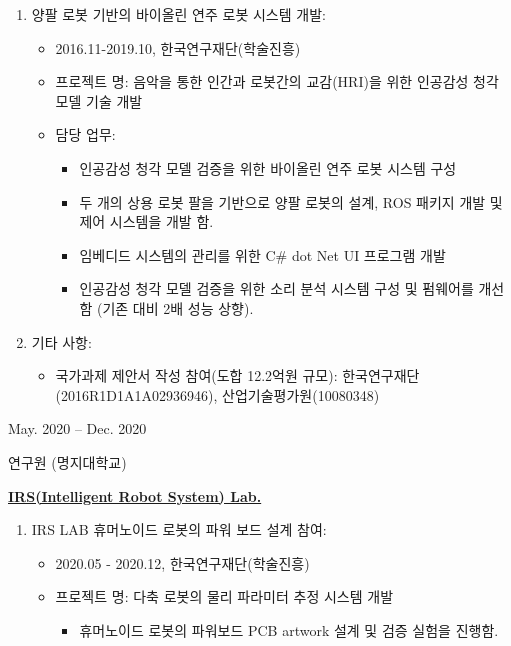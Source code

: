 \documentclass[a4paper,10pt]{article}
\newlength{\cvcolumngapwidth}
\newlength{\cvleftcolumnwidth}
\newlength{\cvrightcolumnwidth}
\newcommand{\cvtitlestyle}[1]{{\large\cvtitlefont\textcolor{cvtitlecolor}{#1}}}
\newcommand{\cvdurationstyle}[1]{{\small\cvdurationfont\textcolor{cvdurationcolor}{#1}}}
\newlength{\cvafteritemskipamount}
\newlength{\cvaftertitleskipamount}
\newlength{\cvparskip}
\newcommand{\cvitem}[2]{
    \begin{minipage}[t]{\cvleftcolumnwidth}
        \raggedleft #1
    \end{minipage}%
    \hspace{\cvcolumngapwidth}%
    \begin{minipage}[t]{\cvrightcolumnwidth}
        \setlength{\parskip}{\cvparskip} #2
    \end{minipage}

    \vspace{\cvafteritemskipamount}
}
\newcommand{\cvtitle}[1]{
    \cvtitlestyle{#1}

    \vspace{\cvaftertitleskipamount}
    \vspace{-\cvparskip}
}
\begin{document}
{\begin{enumerate}
        \item 양팔 로봇 기반의 바이올린 연주 로봇 시스템 개발:
        \begin{itemize}
            \item 2016.11-2019.10, 한국연구재단(학술진흥)
            \item 프로젝트 명: 음악을 통한 인간과 로봇간의 교감(HRI)을 위한 인공감성 청각 모델 기술 개발
            \item 담당 업무:
                \begin{itemize}
                    \item 인공감성 청각 모델 검증을 위한 바이올린 연주 로봇 시스템 구성
                    \item 두 개의 상용 로봇 팔을 기반으로 양팔 로봇의 설계, ROS 패키지 개발 및 제어 시스템을 개발 함.
                    \item 임베디드 시스템의 관리를 위한 C# dot Net UI 프로그램 개발
                    \item 인공감성 청각 모델 검증을 위한 소리 분석 시스템 구성 및 펌웨어를 개선함 (기존 대비 2배 성능 상향).
                \end{itemize}
        \end{itemize}
        \item 기타 사항:
        \begin{itemize}
            \item 국가과제 제안서 작성 참여(도합 12.2억원 규모): 
            \newline 한국연구재단(2016R1D1A1A02936946), 산업기술평가원(10080348)
        \end{itemize}
    \end{enumerate}
}

\cvitem{
    \cvdurationstyle{May. 2020 -- Dec. 2020}
}{
    \cvtitle{연구원 (명지대학교)} 
    \item \underline{\textbf{IRS(Intelligent Robot System) Lab.}}
    \begin{enumerate}[leftmargin=*]
        \item IRS LAB 휴머노이드 로봇의 파워 보드 설계 참여:
        \begin{itemize}
            \item 2020.05 - 2020.12, 한국연구재단(학술진흥)
            \item 프로젝트 명: 다축 로봇의 물리 파라미터 추정 시스템 개발
                \begin{itemize}
                    \item 휴머노이드 로봇의 파워보드 PCB artwork 설계 및 검증 실험을 진행함.
                \end{itemize}
        \end{itemize}
    \end{enumerate}
}
\end{document}
